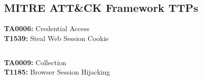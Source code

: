 \documentclass[notitlepage]{article}
\begin{document}
    \subsection{MITRE ATT{\&}CK Framework TTPs}

    \indent\textbf{TA0006:} Credential Access \\
    \indent\indent\textbf{T1539:} Steal Web Session Cookie \\
    
    \subsection*{}
    \indent\textbf{TA0009:} Collection \\
    \indent\indent\textbf{T1185:} Browser Session Hijacking \\
\end{document}
